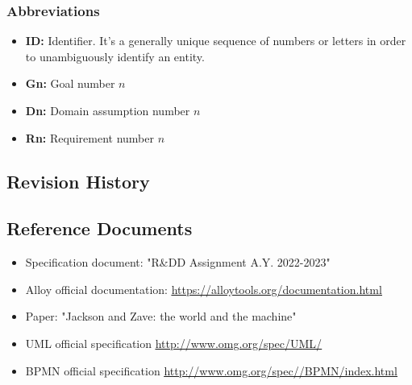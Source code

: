 \subsubsection{Abbreviations}
\begin{itemize}
        \item \textbf{ID:} Identifier. It's a generally unique sequence of numbers or letters in order to unambiguously identify an entity.
        \item \textbf{Gn:} Goal number $n$
        \item \textbf{Dn:} Domain assumption number $n$
        \item \textbf{Rn:} Requirement number $n$
\end{itemize}
\subsection{Revision History}
\subsection{Reference Documents}
\begin{itemize}
        \item Specification document: "R\&DD Assignment A.Y. 2022-2023"
        \item Alloy official documentation: \underline{\url{https://alloytools.org/documentation.html}}
        \item Paper: "Jackson and Zave: the world and the machine"
        \item UML official specification \underline{\url{http://www.omg.org/spec/UML/}}
        \item BPMN official specification \underline{\url{http://www.omg.org/spec//BPMN/index.html}}
\end{itemize}

